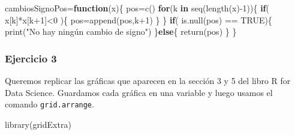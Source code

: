 \documentclass[
]{article}
\newenvironment{Shaded}{\begin{snugshade}}{\end{snugshade}}
\newcommand{\ConstantTok}[1]{\textcolor[rgb]{0.00,0.00,0.00}{#1}}
\newcommand{\ControlFlowTok}[1]{\textcolor[rgb]{0.13,0.29,0.53}{\textbf{#1}}}
\newcommand{\DecValTok}[1]{\textcolor[rgb]{0.00,0.00,0.81}{#1}}
\newcommand{\FunctionTok}[1]{\textcolor[rgb]{0.00,0.00,0.00}{#1}}
\newcommand{\NormalTok}[1]{#1}
\newcommand{\OtherTok}[1]{\textcolor[rgb]{0.56,0.35,0.01}{#1}}
\newcommand{\SpecialCharTok}[1]{\textcolor[rgb]{0.00,0.00,0.00}{#1}}
\newcommand{\StringTok}[1]{\textcolor[rgb]{0.31,0.60,0.02}{#1}}
\begin{document}
\begin{Shaded}
\begin{Highlighting}[]
\NormalTok{cambiosSignoPos}\OtherTok{=}\ControlFlowTok{function}\NormalTok{(x)\{}
\NormalTok{pos}\OtherTok{=}\FunctionTok{c}\NormalTok{()}
  \ControlFlowTok{for}\NormalTok{(k }\ControlFlowTok{in} \FunctionTok{seq}\NormalTok{(}\FunctionTok{length}\NormalTok{(x)}\SpecialCharTok{{-}}\DecValTok{1}\NormalTok{))\{}
    \ControlFlowTok{if}\NormalTok{( x[k]}\SpecialCharTok{*}\NormalTok{x[k}\SpecialCharTok{+}\DecValTok{1}\NormalTok{]}\SpecialCharTok{\textless{}}\DecValTok{0}\NormalTok{ )\{}
\NormalTok{      pos}\OtherTok{=}\FunctionTok{append}\NormalTok{(pos,k}\SpecialCharTok{+}\DecValTok{1}\NormalTok{)}
\NormalTok{    \}}
\NormalTok{  \}}
  \ControlFlowTok{if}\NormalTok{( }\FunctionTok{is.null}\NormalTok{(pos) }\SpecialCharTok{==} \ConstantTok{TRUE}\NormalTok{)\{}
    \FunctionTok{print}\NormalTok{(}\StringTok{"No hay ningún cambio de signo"}\NormalTok{)}
\NormalTok{    \}}\ControlFlowTok{else}\NormalTok{\{}
      \FunctionTok{return}\NormalTok{(pos)}
\NormalTok{    \}}
\NormalTok{\}}
\end{Highlighting}
\end{Shaded}

\hypertarget{ejercicio-3}{%
\subsubsection{Ejercicio 3}\label{ejercicio-3}}

Queremos replicar las gráficas que aparecen en la sección 3 y 5 del
libro R for Data Science. Guardamos cada gráfica en una variable y luego
usamos el comando \texttt{grid.arrange}.

\begin{Shaded}
\begin{Highlighting}[]
\FunctionTok{library}\NormalTok{(gridExtra)}
\end{Highlighting}
\end{Shaded}
\end{document}
